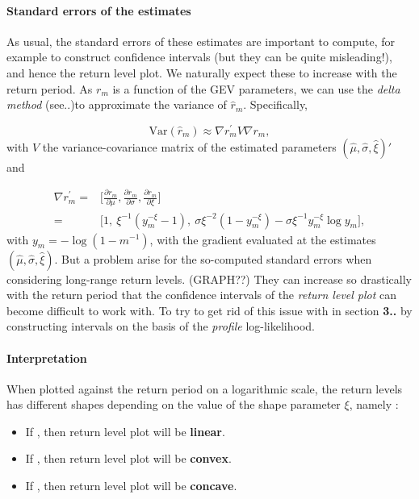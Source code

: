 \documentclass[11pt,a4paper,openany ]{book}
\begin{document}
\paragraph*{Standard errors of the estimates}As usual, the standard errors of these estimates are important to compute, for example to construct confidence intervals (but they can be quite misleading!), and hence the return level plot. We naturally expect these to increase with the return period.
As $r_m$ is a function of the GEV parameters, we can use the \emph{delta method} (see..)to approximate the variance of $\hat{r}_m$. Specifically,

\begin{equation*}
\text{Var}(\hat{r}_m)\approx\nabla{r^{'}_m}V\nabla{r_m},
\end{equation*}
with $V$ the variance-covariance matrix of the estimated parameters $(\hat{\mu},\hat{\sigma},\hat{\xi})'$ and 

\begin{equation} \label{delta}
\begin{aligned}
\nabla r^{'}_m=
& \Bigg[\frac{\partial r_m}{\partial\mu},\frac{\partial r_m}{\partial\sigma},\frac{\partial r_m}{\partial\xi}\Bigg] \\ 
= & \Big[1,\ \xi^{-1}(y_m^{-\xi}-1),\ \sigma\xi^{-2}(1-y_m^{-\xi})-\sigma\xi^{-1}y_m^{-\xi}\log y_m\Big],
\end{aligned}
\end{equation}
with $y_m=-\log (1-m^{-1})$, with the gradient evaluated at the estimates $(\hat{\mu},\hat{\sigma},\hat{\xi})$.
But a problem arise for the so-computed standard errors when considering long-range return levels. (GRAPH??) They can increase so drastically with the return period that the confidence intervals of the \emph{return level plot} can become difficult to work with. To try to get rid of this issue with in section \textbf{3..} by constructing intervals on the basis of the \emph{profile} log-likelihood. 

\paragraph*{Interpretation}

When plotted against the return period on a logarithmic scale, the return levels has different shapes depending on the value of the shape parameter $\xi$, namely :

\begin{itemize}
	\item If , then return level plot will be \textbf{linear}.
     \item If , then return level plot will be \textbf{convex}.
     \item If , then return level plot will be \textbf{concave}.
\end{itemize}
\end{document}
